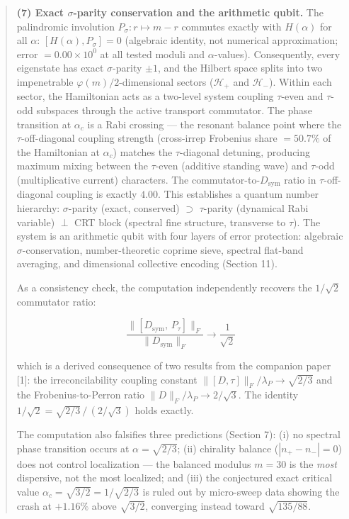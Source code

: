 \documentclass[11pt,letterpaper]{article}
\theoremstyle{definition}
\theoremstyle{remark}
\begin{document}
\begin{abstract}
\textbf{(7) Exact $\sigma$-parity conservation and the arithmetic qubit.} The palindromic involution $P_\sigma: r \mapsto m - r$ commutes exactly with $H(\alpha)$ for all $\alpha$: $[H(\alpha), P_\sigma] = 0$ (algebraic identity, not numerical approximation; error $= 0.00 \times 10^{0}$ at all tested moduli and $\alpha$-values). Consequently, every eigenstate has exact $\sigma$-parity $\pm 1$, and the Hilbert space splits into two impenetrable $\varphi(m)/2$-dimensional sectors ($\mathcal{H}_+$ and $\mathcal{H}_-$). Within each sector, the Hamiltonian acts as a two-level system coupling $\tau$-even and $\tau$-odd subspaces through the active transport commutator. The phase transition at $\alpha_c$ is a Rabi crossing --- the resonant balance point where the $\tau$-off-diagonal coupling strength (cross-irrep Frobenius share $= 50.7\%$ of the Hamiltonian at $\alpha_c$) matches the $\tau$-diagonal detuning, producing maximum mixing between the $\tau$-even (additive standing wave) and $\tau$-odd (multiplicative current) characters. The commutator-to-$D_{\text{sym}}$ ratio in $\tau$-off-diagonal coupling is exactly $4.00$. This establishes a quantum number hierarchy: $\sigma$-parity (exact, conserved) $\supset$ $\tau$-parity (dynamical Rabi variable) $\perp$ CRT block (spectral fine structure, transverse to $\tau$). The system is an arithmetic qubit with four layers of error protection: algebraic $\sigma$-conservation, number-theoretic coprime sieve, spectral flat-band averaging, and dimensional collective encoding (Section 11).

As a consistency check, the computation independently recovers the $1/\sqrt{2}$ commutator ratio:

\[\frac{\|[D_{\text{sym}},\, P_\tau]\|_F}{\|D_{\text{sym}}\|_F} \longrightarrow \frac{1}{\sqrt{2}}\]

which is a derived consequence of two results from the companion paper [1]: the irreconcilability coupling constant $\|[D,\tau]\|_F / \lambda_P \to \sqrt{2/3}$ and the Frobenius-to-Perron ratio $\|D\|_F / \lambda_P \to 2/\sqrt{3}$. The identity $1/\sqrt{2} = \sqrt{2/3} \,/\, (2/\sqrt{3})$ holds exactly.

The computation also falsifies three predictions (Section 7): (i) no spectral phase transition occurs at $\alpha = \sqrt{2/3}$; (ii) chirality balance ($|n_+ - n_-| = 0$) does not control localization --- the balanced modulus $m = 30$ is the \emph{most} dispersive, not the most localized; and (iii) the conjectured exact critical value $\alpha_c = \sqrt{3/2} = 1/\sqrt{2/3}$ is ruled out by micro-sweep data showing the crash at $+1.16\%$ above $\sqrt{3/2}$, converging instead toward $\sqrt{135/88}$.

\end{abstract}
\end{document}
